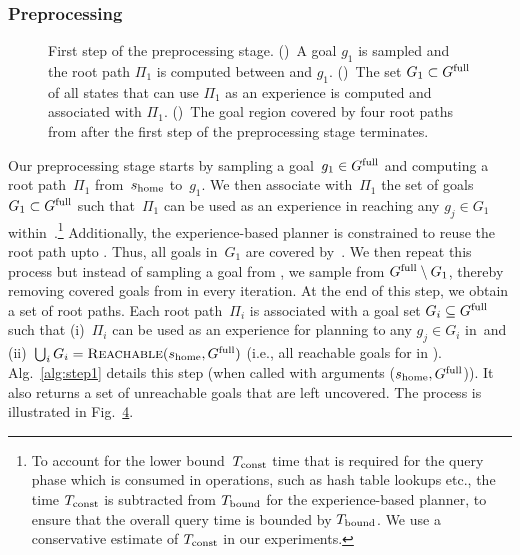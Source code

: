 \documentclass[a4paper]{report}
\begin{document}
\subsubsection{Preprocessing}
\begin{figure*}[t]
    \centering
    \begin{subfigure}{.47\textwidth}
        \caption{}
        \label{fig:crp1}
    \end{subfigure}
    \hspace{4mm}
    \begin{subfigure}{0.47\textwidth}
        \caption{}
        \label{fig:crp2}
    \end{subfigure}
    \hspace{4mm}
    \begin{subfigure}{0.48\textwidth}
        \caption{}
        \label{fig:crp3}
    \end{subfigure}
    \caption{\CaptionTextSize
    First step of the preprocessing stage.
    ()~A goal $g_1$ is sampled and the root path $\Pi_1$ is computed between \Shome and $g_1$.
    ()~The set $G_1 \subset G^{\textrm{full}}$ of all states that can use $\Pi_1$ as an experience is computed and associated with $\Pi_1$.
    ()~The goal region covered by four root paths from \Shome after the first step of the preprocessing stage terminates.
    }
    \label{fig:crp}
\end{figure*}

Our preprocessing stage starts by sampling a goal~$g_1 \in G^{\textrm{full}}$ and computing a root path~$\Pi_1$ from~$s_{\textrm{home}}$ to~$g_1$. We then associate with~$\Pi_1$ the set of goals ~$G_1 \subset G^{\textrm{full}}$ such that~$\Pi_1$ can be used as an experience in reaching any $g_j \in G_1$ within~\Tbound.\footnote{To account for the lower bound~$T_{\textrm{const}}$ time that is required for the query phase which is consumed in operations, such as hash table lookups etc., the time $T_{\textrm{const}}$ is subtracted from $T_{\textrm{bound}}$ for the experience-based planner, to ensure that the overall query time is bounded by $T_{\textrm{bound}}$. We use a conservative estimate of $T_{\textrm{const}}$ in our experiments.}
Additionally, the experience-based planner is constrained to reuse the root path upto \Trc.
Thus, all goals in~$G_1$ are covered by~\Shome.
%
We then repeat this process but instead of sampling  a goal from \Gfull, we sample from $G^{\textrm{full}} \setminus G_1$, thereby removing covered goals from \Gfull in every iteration.
At the end of this step, we obtain a set of root paths. 
Each root path~$\Pi_i$ is associated with a goal set $G_i \subseteq G^{\textrm{full}}$ such that 
(i)~$\Pi_i$ can be used as an experience for planning to any $g_j \in G_i$ in~\Tbound and 
(ii)~$\bigcup_i G_i = \textsc{Reachable}(s_{\textrm{home}}, G^{\textrm{full}})$ (i.e., all reachable goals for \Shome in \Gfull).
%
Alg.~\ref{alg:step1} details this step (when called with arguments ($s_{\textrm{home}},G^{\textrm{full}}$)). It also returns a set of unreachable goals that are left uncovered.
The process is illustrated in Fig.~\ref{fig:crp}.
\end{document}
